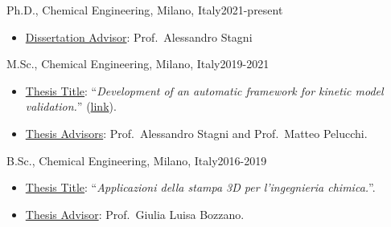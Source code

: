 \begin{position}{Ph.D., Chemical Engineering}{\polimi, Milano, Italy}{2021-present}
   \begin{itemize}
      \item[ ] \ul{Dissertation Advisor}: Prof.\ Alessandro Stagni
   \end{itemize}
\end{position}

\begin{position}{M.Sc., Chemical Engineering}{\polimi, Milano, Italy}{2019-2021}
   \begin{itemize}
      \item[ ] \ul{Thesis Title}: ``{\it Development of an automatic framework for kinetic
         model validation.}'' (\href{https://hdl.handle.net/10589/179004}{link}).
      \item[ ] \ul{Thesis Advisors}: Prof.\ Alessandro Stagni and Prof.\ Matteo Pelucchi.
   \end{itemize}
\end{position}

\begin{position}{B.Sc., Chemical Engineering}{\polimi, Milano, Italy}{2016-2019}
   \begin{itemize}
      \item[ ] \ul{Thesis Title}: ``{\it Applicazioni della stampa 3D per l'ingegnieria chimica.}''.
      \item[ ] \ul{Thesis Advisor}: Prof.\ Giulia Luisa Bozzano.
   \end{itemize}
\end{position}

